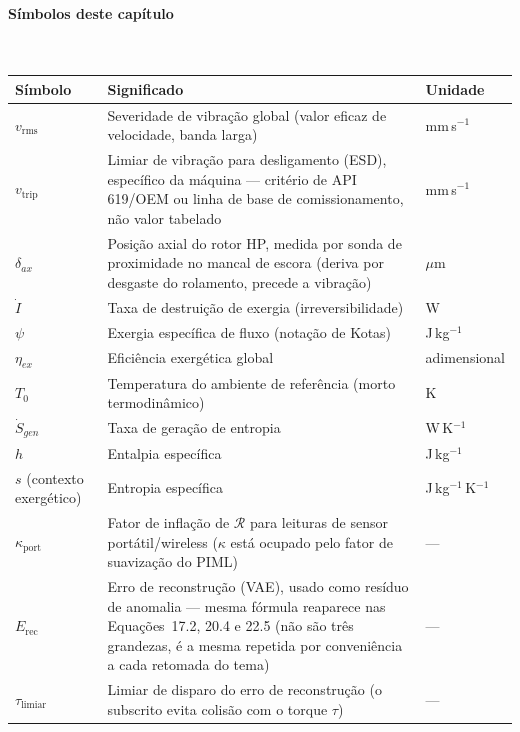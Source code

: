 \documentclass[12pt,a4paper]{article}
\numberwithin{equation}{section}
\numberwithin{table}{section}
\numberwithin{figure}{section}
\begin{document}
{\paragraph{Símbolos deste capítulo}\mbox{}\\[-0.5em]
{\small
\begin{longtable}{>{\raggedright\arraybackslash}p{2.6cm} >{\raggedright\arraybackslash}p{9.2cm} >{\raggedright\arraybackslash}p{2.6cm}}
	\toprule
	\textbf{Símbolo} & \textbf{Significado} & \textbf{Unidade} \\ \midrule
	\endhead
	$v_{\text{rms}}$ & Severidade de vibração global (valor eficaz de velocidade, banda larga) & mm\,s$^{-1}$ \\
	$v_{\text{trip}}$ & Limiar de vibração para desligamento (ESD), específico da máquina — critério de API 619/OEM ou linha de base de comissionamento, não valor tabelado & mm\,s$^{-1}$ \\
	$\delta_{ax}$ & Posição axial do rotor HP, medida por sonda de proximidade no mancal de escora (deriva por desgaste do rolamento, precede a vibração) & $\mu$m \\
	$\dot{I}$ & Taxa de destruição de exergia (irreversibilidade) & W \\
	$\psi$\dag & Exergia específica de fluxo (notação de Kotas) & J\,kg$^{-1}$ \\
	$\eta_{ex}$ & Eficiência exergética global & adimensional \\
	$T_0$ & Temperatura do ambiente de referência (morto termodinâmico) & K \\
	$\dot{S}_{gen}$ & Taxa de geração de entropia & W\,K$^{-1}$ \\
	$h$ & Entalpia específica & J\,kg$^{-1}$ \\
	$s$ (contexto exergético) & Entropia específica & J\,kg$^{-1}$\,K$^{-1}$ \\
	$\kappa_{\text{port}}$\dag & Fator de inflação de $\mathcal{R}$ para leituras de sensor portátil/wireless ($\kappa$ está ocupado pelo fator de suavização do PIML) & --- \\
	$E_{\text{rec}}$ & Erro de reconstrução (VAE), usado como resíduo de anomalia — mesma fórmula reaparece nas Equações~17.2, 20.4 e 22.5 (não são três grandezas, é a mesma repetida por conveniência a cada retomada do tema) & --- \\
	$\tau_{\text{limiar}}$\dag & Limiar de disparo do erro de reconstrução (o subscrito evita colisão com o torque $\tau$) & --- \\
	\bottomrule
\end{longtable}
}






}
\end{document}
